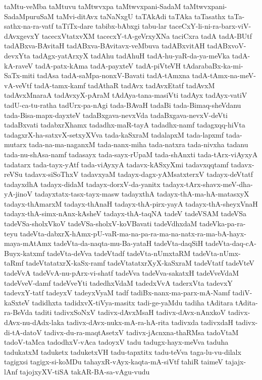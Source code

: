 {taMtu-veMba
taMtuvu
taMtwvxpa
taMtwvxpani-SadaM
taMtwvxpani-SadaMpuruSaM
taMvi-ditAvx
taNaNxgU
taTAkAdi
taTAka
taTasathx
taTa-sathx-na-ra-vatf
taTiTx-dare
tabibx-bAbxgi
tabu-lar
taceCxY-li-ni-ra-barx-viV-dAvxgevxY
tacecxVtatxvXM
tacecxY-tA-geVrxyXNa
taciCxra
tadA
tadA-BUtf
tadABxva-BAvitaH
tadABxva-BAvitavx-veMbuva
tadABxvitAH
tadABxvoV-devxYta
tadAgx-yatArxyX
tadAhu
tadAhuH
tadA-hu-yaR-da-ya-meVka
tadA-kA-raveV
tadA-patx-kAma
tadA-payxteV
tadA-piVteVH
tAdarabaBx-ka-mi-SaTx-miti
tadAsa
tadA-saMpa-nonxV-Bavati
tadA-tAmxna
tadA-tAmx-na-meV-vA-veVtf
tadA-tamx-kamf
tadAthaR
tadAvx
tadAvxEtatf
tadAvxM
tadAvxMnaraA
tadAvxyX-pAraM
tAdAya-tana-masiVti
tadAyx
tadAyx-vatiV
tadU-ca-tu-ratha
tadUrx-pa-nAgi
tada-BAvaH
tadaBi
tada-Bimaq-sheVdanu
tada-Bisa-mapx-dayxteV
tadaBxgava-nevxVda
tadaBxgava-nevxV-deVti
tadaBxvati
tadabxrXhamx
tadadhx-maR-tayA
tadadhx-namf
tadagxqq-hiVta
tadagxrX-ha-satxvX-setxyXVva
tada-kaSxraM
tadalapxM
tada-lapxmf
tada-mutarx
tada-na-ma-naganxM
tada-nanx-miha
tada-natxra
tada-nivxha
tadanu
tada-nu-shAsa-namf
tadasayx
tada-sayx-rUpaM
tada-shAnxti
tada-tArx-viAyxyA
tadatarx
tada-tayx-yAtf
tada-viAyxyA
tadavx-kASxyXmi
tadavxqqtamf
tadavx-reVSu
tadavx-siSoThxV
tadavxyaM
tadayx-dagx-yAMsatxterxV
tadayx-deVtatf
tadayxdhA
tadayx-didaM
tadayx-dorxV-da-yanitx
tadayx-tArx-shavx-meV-dha-yA-jinoV
tadayxtatx-tasx-tayx-masw
tadayxthA
tadayx-thA-ma-hA-matasxyX
tadayx-thAmarxM
tadayx-thAnaH
tadayx-thA-pirx-yayA
tadayx-thA-sheyxVnaH
tadayx-thA-simx-nAnx-kAsheV
tadayx-thA-taqNA
tadeV
tadeVSAM
tadeVSa
tadeVSa-sholxVkoV
tadeVSa-sholxV-koVBavati
tadeVdhxdaM
tadeVka-pa-ra-teyu
tadeVta-dabxrX-hAmx-pU-vaR-ma-na-pa-ra-ma-na-natx-ra-ma-bA-hayx-maya-mAtAmx
tadeVta-da-naqta-mu-Ba-yataH
tadeVta-daqSiH
tadeVta-daq-cA-Buyx-katxmf
tadeVta-deVva
tadeVtadf
tadeVta-nUmxtaRM
tadeVta-nUmx-taRmf
tadeVtatatxrX-kaSx-ramf
tadeVtatatxrXyX-kaSxraM
tadeVtatf
tadeVteV
tadeVvA
tadeVvA-nu-pArx-vi-shatf
tadeVva
tadeVva-sakatxH
tadeVveVdaM
tadeVveV-damf
tadeVveYti
tadedhxVdaM
tadedxVvA
taderxVta
tadevxY
tadevxY-tatf
tadeyxV
tadeyxVyaM
tadf
tadiBx-nanx-ma-parx-mA-Namf
tadiV-kaSxteV
tadidhxta
tadidxvX-tiVya-masitx
tadi-ge-yaMdu
tadiha
tAditara
tAdita-ra-BeVda
taditi
tadivxSoNxV
tadivx-dAvxMsaH
tadivx-dAvx-nAnxkoV
tadivx-dAvx-nu-dAdx-laka
tadivx-dAvx-nukx-mA-ra-hA-rita
tadivxda
tadivxdaH
tadivx-di-tA-datoV
tadivx-du-ra-maqtAsetxV
tadivx-jAcnxna-thaRMsa
tadoVtaM
tadoV-taMca
tadodhxV-vAca
tadoyxV
tadu
tadugx-hayx-meVva
taduha
tadukatxM
taduketx
taduketxVH
tadu-tapxtitx
tadu-teVva
taga-lu-vu-dilalx
tagigxsi
tagigx-si-koMDu
tahayxR-vAyx-kaqta-mA-siVtf
tahiR
taimeV
tajajx-lAnf
tajojxyXV-tiSA
takAR-BA-sa-vAgu-vudu
}
